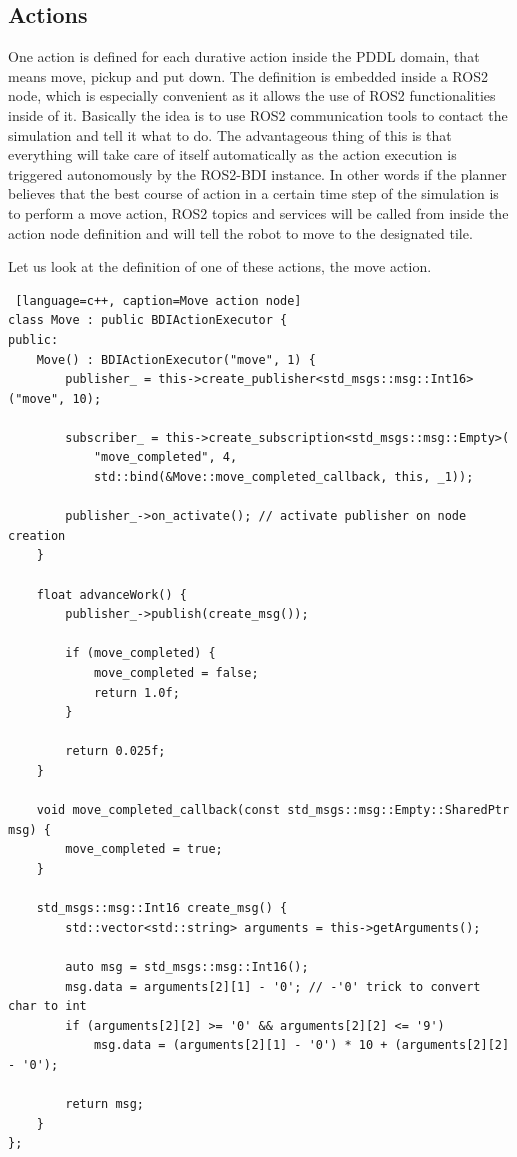 \subsection{Actions}
One action is defined for each durative action inside the PDDL domain, that means move, pickup and put down. The definition is embedded inside a ROS2 node, which is especially convenient as it allows the use of ROS2 functionalities inside of it. Basically the idea is to use ROS2 communication tools to contact the simulation and tell it what to do. The advantageous thing of this is that everything will take care of itself automatically as the action execution is triggered autonomously by the ROS2-BDI instance. In other words if the planner believes that the best course of action in a certain time step of the simulation is to perform a move action, ROS2 topics and services will be called from inside the action node definition and will tell the robot to move to the designated tile.
\par
Let us look at the definition of one of these actions, the move action.
\begin{lstlisting} [language=c++, caption=Move action node]
class Move : public BDIActionExecutor {
public:
    Move() : BDIActionExecutor("move", 1) {
        publisher_ = this->create_publisher<std_msgs::msg::Int16>("move", 10);

        subscriber_ = this->create_subscription<std_msgs::msg::Empty>(
            "move_completed", 4,
            std::bind(&Move::move_completed_callback, this, _1));

        publisher_->on_activate(); // activate publisher on node creation
    }

    float advanceWork() {
        publisher_->publish(create_msg());

        if (move_completed) {
            move_completed = false;
            return 1.0f;
        }

        return 0.025f;
    }

    void move_completed_callback(const std_msgs::msg::Empty::SharedPtr msg) {
        move_completed = true;
    }

    std_msgs::msg::Int16 create_msg() {
        std::vector<std::string> arguments = this->getArguments();

        auto msg = std_msgs::msg::Int16();
        msg.data = arguments[2][1] - '0'; // -'0' trick to convert char to int
        if (arguments[2][2] >= '0' && arguments[2][2] <= '9')
            msg.data = (arguments[2][1] - '0') * 10 + (arguments[2][2] - '0');
        
        return msg;
    }
};
\end{lstlisting}
